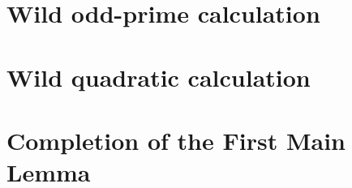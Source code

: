 \chapter{Wild odd-prime calculation}

















\chapter{Wild quadratic calculation}















\chapter{Completion of the First Main Lemma}


